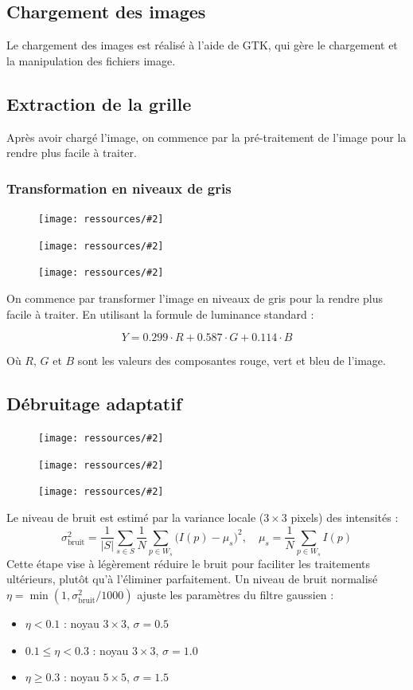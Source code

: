 \documentclass{article}
\newcommand{\stepimage}[3][0.3\textwidth]{%
  \minipage{#1}
    \texttt{[image: ressources/\#2]}
    \caption{#3}
  \endminipage\hfill
}
\begin{document}
\subsection{Chargement des images}

Le chargement des images est réalisé à l'aide de GTK, qui gère le chargement et la manipulation des fichiers image.

\subsection{Extraction de la grille}

Après avoir chargé l'image, on commence par la pré-traitement de l'image pour la rendre plus facile à traiter.

\subsubsection{Transformation en niveaux de gris}
\begin{figure}[!htb]
    \stepimage[0.30\textwidth]{image_1_step_01_grayscale.png}{}
    \stepimage[0.30\textwidth]{image_2_step_01_grayscale.png}{}
    \stepimage[0.26\textwidth]{image_3_step_01_grayscale.png}{}
\end{figure}
On commence par transformer l'image en niveaux de gris pour la rendre plus facile à traiter.
En utilisant la formule de luminance standard :

\[
Y = 0.299 \cdot R + 0.587 \cdot G + 0.114 \cdot B
\]

Où $R$, $G$ et $B$ sont les valeurs des composantes rouge, vert et bleu de l'image.


\subsection{Débruitage adaptatif}
\begin{figure}[!htb]
    \stepimage[0.30\textwidth]{image_1_step_02_adaptive_denoise.png}{}
    \stepimage[0.30\textwidth]{image_2_step_02_adaptive_denoise.png}{}
    \stepimage[0.26\textwidth]{image_3_step_02_adaptive_denoise.png}{}
\end{figure}
Le niveau de bruit est estimé par la variance locale (\(3 \times 3\) pixels) des intensités :
\[
\sigma_{\text{bruit}}^{2} = \frac{1}{|S|} \sum_{s \in S} \frac{1}{N} \sum_{p \in W_s} \big(I(p) - \mu_s\big)^2, \quad \mu_s = \frac{1}{N} \sum_{p \in W_s} I(p)
\]
Cette étape vise à légèrement réduire le bruit pour faciliter les traitements ultérieurs, plutôt qu'à l'éliminer parfaitement.
\newline
Un niveau de bruit normalisé \(\eta = \min(1, \sigma_{\text{bruit}}^{2}/1000)\) ajuste les paramètres du filtre gaussien :
\begin{itemize}
    \item $\eta < 0.1$ : noyau $3\times3$, $\sigma=0.5$
    \item $0.1 \leq \eta < 0.3$ : noyau $3\times3$, $\sigma=1.0$
    \item $\eta \geq 0.3$ : noyau $5\times5$, $\sigma=1.5$
\end{itemize}
\end{document}
